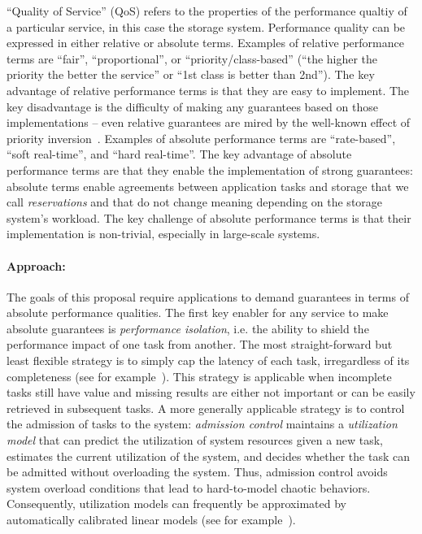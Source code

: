 ``Quality of Service'' (QoS) refers to the
properties of the performance qualtiy of a particular service, in
this case the storage system.
Performance quality can be expressed in either relative or absolute
terms. Examples of relative performance terms are ``fair'',
``proportional'', or ``priority/class-based'' (``the higher the
priority the better the service'' or ``1st class is better than
2nd''). The key advantage of relative performance terms is that
they are easy to implement. The key disadvantage is the difficulty
of making any guarantees based on those implementations --
even relative guarantees are mired by the well-known effect of
priority inversion~\cite{lampson:cacm80}. Examples of absolute
performance terms are ``rate-based'', ``soft real-time'', and
``hard real-time''. The key advantage of absolute performance
terms are that they enable the implementation of strong
guarantees: absolute terms enable agreements between application
tasks and storage that we call \emph{reservations} and that do not
change meaning depending
on the storage system's workload. The key challenge of absolute
performance terms is that their implementation is non-trivial,
especially in large-scale systems.

\paragraph{Approach:} The goals of this proposal require applications
to demand guarantees in terms of absolute performance qualities.
The first key enabler for any service to make absolute guarantees
is \emph{performance isolation}, i.e. the ability to shield the
performance impact of one task from another. The most straight-forward
but least flexible strategy is to simply cap the latency of each
task, irregardless of its completeness (see for
example~\cite{decandia:sosp07}). This strategy is applicable when
incomplete tasks still have value and missing results are either
not important or can be easily retrieved in subsequent tasks. A
more generally applicable strategy is to control the admission of
tasks to the system: \emph{admission control} maintains a
\emph{utilization model} that can predict the utilization of system
resources given a new task, estimates the current utilization of
the system, and decides whether the task can be admitted without
overloading the system. Thus, admission control avoids system
overload conditions that lead to hard-to-model chaotic behaviors.
Consequently, utilization models can frequently be approximated by
automatically calibrated linear models (see for
example~\cite{skourtis:hpdc12}).

